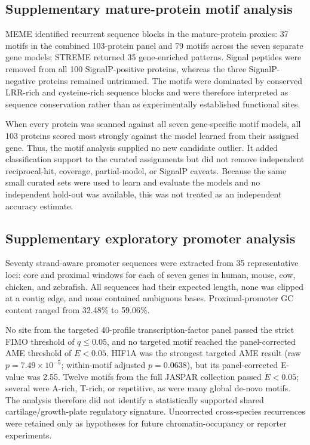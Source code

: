 \subsection{Supplementary mature-protein motif analysis}
\label{subsec:results-protein-motifs}

MEME identified recurrent sequence blocks in the mature-protein proxies: 37
motifs in the combined 103-protein panel and 79 motifs across the seven separate
gene models; STREME returned 35 gene-enriched patterns. Signal peptides were
removed from all 100 SignalP-positive proteins, whereas the three
SignalP-negative proteins remained untrimmed. The motifs were dominated by
conserved LRR-rich and
cysteine-rich sequence blocks and were therefore interpreted as sequence
conservation rather than as experimentally established functional sites.

When every protein was scanned against all seven gene-specific motif models,
all 103 proteins scored most strongly against the model learned from their
assigned gene. Thus, the motif analysis supplied no new candidate outlier. It
added classification support to the curated assignments but did not remove
independent reciprocal-hit, coverage, partial-model, or SignalP caveats. Because
the same small curated sets were used to learn and evaluate the models and no
independent hold-out was available, this was not treated as an independent
accuracy estimate.

\subsection{Supplementary exploratory promoter analysis}
\label{subsec:results-promoter-motifs}

Seventy strand-aware promoter sequences were extracted from 35 representative
loci: core and proximal windows for each of seven genes in human, mouse, cow,
chicken, and zebrafish. All sequences had their expected length, none was
clipped at a contig edge, and none contained ambiguous bases. Proximal-promoter
GC content ranged from 32.48\% to 59.06\%.

No site from the targeted 40-profile transcription-factor panel passed the
strict FIMO threshold of $q\leq0.05$, and no targeted motif reached the
panel-corrected AME threshold of $E<0.05$. HIF1A was the strongest targeted AME
result (raw $p=7.49\times10^{-5}$; within-motif adjusted $p=0.0638$), but its
panel-corrected E-value was 2.55. Twelve motifs from the full JASPAR collection
passed $E<0.05$; several were A-rich, T-rich, or repetitive, as were many global
de-novo motifs. The analysis therefore did not identify a statistically
supported shared cartilage/growth-plate regulatory signature. Uncorrected
cross-species recurrences were retained only as hypotheses for future
chromatin-occupancy or reporter experiments.

